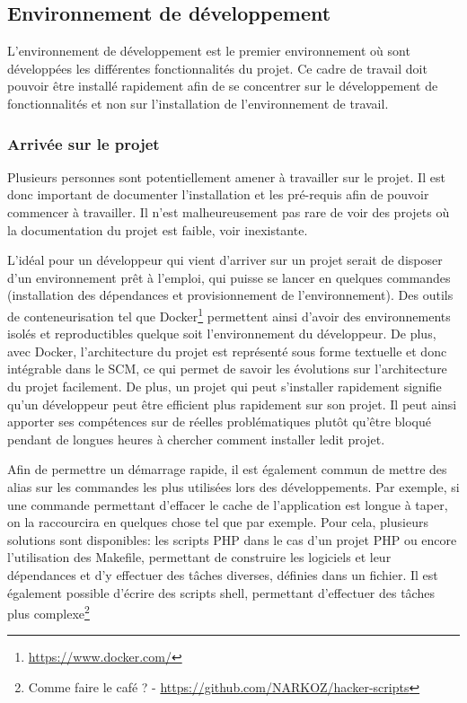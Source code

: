 
\subsection{Environnement de développement}

L'environnement de développement est le premier environnement où sont développées les différentes fonctionnalités du projet. Ce cadre de travail doit pouvoir être installé rapidement afin de se concentrer sur le développement de fonctionnalités et non sur l'installation de l'environnement de travail.

\subsubsection{Arrivée sur le projet}

Plusieurs personnes sont potentiellement amener à travailler sur le projet. Il est donc important de documenter l'installation et les pré-requis afin de pouvoir commencer à travailler. Il n'est malheureusement pas rare de voir des projets où la documentation du projet est faible, voir inexistante.

L'idéal pour un développeur qui vient d'arriver sur un projet serait de disposer d'un environnement prêt à l'emploi, qui puisse se lancer en quelques commandes (installation des dépendances et provisionnement de l'environnement). Des outils de conteneurisation tel que Docker\footnote{\url{https://www.docker.com/}} permettent ainsi d'avoir des environnements isolés et reproductibles quelque soit l'environnement du développeur. De plus, avec Docker, l'architecture du projet est représenté sous forme textuelle et donc intégrable dans le \gls{SCM}, ce qui permet de savoir les évolutions sur l'architecture du projet facilement. De plus, un projet qui peut s'installer rapidement signifie qu'un développeur peut être efficient plus rapidement sur son projet. Il peut ainsi apporter ses compétences sur de réelles problématiques plutôt qu'être bloqué pendant de longues heures à chercher comment installer ledit projet.

Afin de permettre un démarrage rapide, il est également commun de mettre des alias sur les commandes les plus utilisées lors des développements. Par exemple, si une commande permettant d'effacer le cache de l'application est longue à taper, on la raccourcira en quelques chose tel que  par exemple. Pour cela, plusieurs solutions sont disponibles: les scripts \gls{PHP} dans le cas d'un projet \gls{PHP} ou encore l'utilisation des Makefile, permettant de construire les logiciels et leur dépendances et d'y effectuer des tâches diverses, définies dans un fichier. Il est également possible d'écrire des scripts shell, permettant d'effectuer des tâches plus complexe\footnote{Comme faire le café ?  - \url{https://github.com/NARKOZ/hacker-scripts}}


